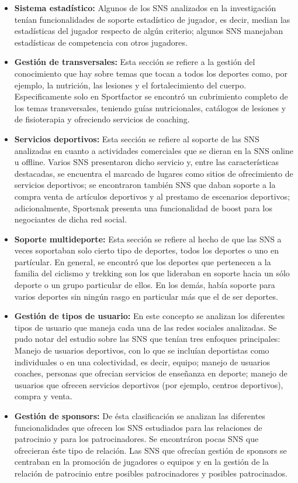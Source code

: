 \begin{itemize}
	\item \textbf{Sistema estadístico:} Algunos de los SNS analizados en la investigación tenían funcionalidades de soporte estadístico de jugador, es decir, median las estadísticas del jugador respecto de algún criterio; algunos SNS manejaban estadísticas de competencia con otros jugadores.
	\item \textbf{Gestión de transversales:} Esta sección se refiere a la gestión del conocimiento que hay sobre temas que tocan a todos los deportes como, por ejemplo, la nutrición, las lesiones y el fortalecimiento del cuerpo. Especificamente solo en Sportfactor se encontró un cubrimiento completo de los temas transversales, teniendo guías nutricionales, catálogos de lesiones y de fisioterapia y ofreciendo servicios de coaching. 
	\item \textbf{Servicios deportivos:} Esta sección se refiere al soporte de las SNS analizadas en cuanto a actividades comerciales que se dieran en la SNS online u offline. Varios SNS presentaron dicho servicio y, entre las características destacadas, se encuentra el marcado de lugares como sitios de ofrecimiento de servicios deportivos; se encontraron también SNS que daban soporte a la compra venta de artículos deportivos y al prestamo de escenarios deportivos; adicionalmente, Sportsnak presenta una funcionalidad de boost para los negociantes de dicha red social.
	\item \textbf{Soporte multideporte:} Esta sección se refiere al hecho de que las SNS a veces soportaban solo cierto tipo de deportes, todos los deportes o uno en partícular. En general, se encontró que los deportes que pertenecen a la familia del ciclismo y trekking son los que lideraban en soporte hacia un sólo deporte o un grupo particular de ellos. En los demás, había soporte para varios deportes sin ningún rasgo en particular más que el de ser deportes.
	\item \textbf{Gestión de tipos de usuario:} En este concepto se analizan los diferentes tipos de usuario que maneja cada una de las redes sociales analizadas. Se pudo notar del estudio sobre las SNS que tenían tres enfoques principales: Manejo de usuarios deportivos, con lo que se incluían deportistas como individuales o en una colectividad, es decir, equipo; manejo de usuarios coaches, personas que ofrecian servicios de enseñanza en deporte; manejo de usuarios que ofrecen servicios deportivos (por ejemplo, centros deportivos), compra y venta.
	\item \textbf{Gestión de sponsors:} De ésta clasificación se analizan las diferentes funcionalidades que ofrecen los SNS estudiados para las relaciones de patrocinio y para los patrocinadores. Se encontráron pocas SNS que ofrecieran éste tipo de relación. Las SNS que ofrecían gestión de sponsors se centraban en la promoción de jugadores o equipos y en la gestión de la relación de patrocinio entre posibles patrocinadores y posibles patrocinados.

\end{itemize}
